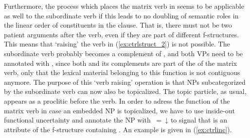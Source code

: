Furthermore, the process which places the matrix verb in  seems to be
applicable as well to the subordinate verb if this leads to no doubling of
semantic roles in the linear order of constituents in the clause. That is,
there must not be two patient arguments after the verb, even if they are part
of different f-structures. This means that `raising' the verb in
(\ref{ex:ctrlstruct_2}) is not possible. The subordinate verb probably becomes
a complement of , and both VPs need to be annotated with
\ups{\XCompl}, since both  and its complements are part of the
\XCompl{} of the matrix verb, only that the lexical material belonging to this
function is not contiguous anymore. The purpose of this `verb raising'
operation is that NPs subcategorized by the subordinate verb can now also be
topicalized. The topic particle, as usual, appears as a proclitic before the
verb. In order to adress the \Top{} function of the matrix verb in case an
embedded NP is topicalized, we have to use inside-out functional uncertainty
and annotate the NP with \uncertain{\XCompl}{\Top}~=~↓ to signal that \Top{} is
an attribute of the f-structure containing \XCompl{}. An example is given in
(\ref{ex:ctrlinc}).


